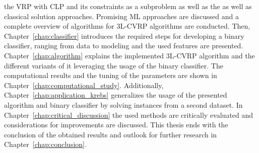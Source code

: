 the \gls{VRP} with CLP and its constraints as a subproblem as well as the as well as classical
solution approaches. Promising \gls{ML} approaches are discussed and a complete overview of algorithms
for \gls{3L-CVRP} algorithms are conducted. Then, Chapter~\ref{chap:classifier} introduces the required
steps for developing a binary classifier, ranging from data to modeling and the used features
are presented. Chapter~\ref{chap:algorithm} explains the implemented \gls{3L-CVRP} algorithm and
the different variants of it leveraging the usage of the binary classifier. The computational results and the
tuning of the parameters are shown in Chapter~\ref{chap:computational_study}. Additionally, Chapter~\ref{chap:application_krebs}
generalizes the usage of the presented algorithm and binary classifier by solving instances from a second dataset.
In Chapter~\ref{chap:critical_discussion} the used methods are critically evaluated and considerations for improvements
are discussed. This thesis ends with the conclusion
of the obtained results and outlook for further research in Chapter~\ref{chap:conclusion}.
